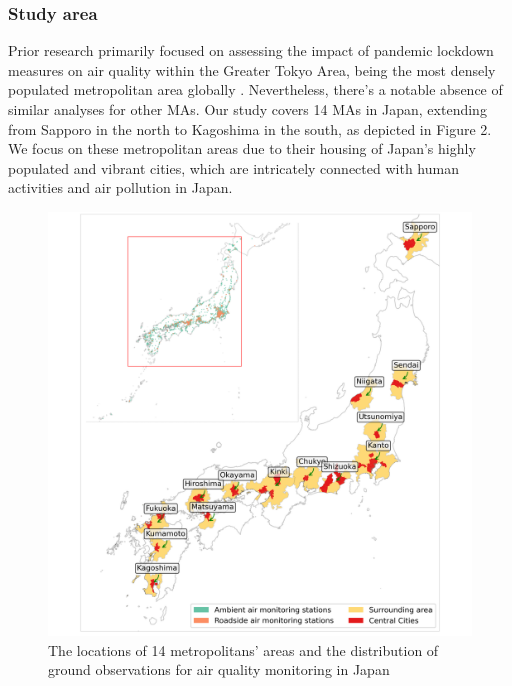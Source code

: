 \subsubsection*{Study area}
Prior research primarily focused on assessing the impact of pandemic lockdown measures on air quality within the Greater Tokyo Area, being the most densely populated metropolitan area globally \citep{damiani2022peculiar,zoran2023peculiar}. Nevertheless, there's a notable absence of similar analyses for other MAs. Our study covers 14 MAs in Japan, extending from Sapporo in the north to Kagoshima in the south, as depicted in Figure 2. We focus on these metropolitan areas due to their housing of Japan's highly populated and vibrant cities, which are intricately connected with human activities and air pollution in Japan.\par
\begin{figure}[p]
    \centering
    \includegraphics[width=\textwidth]{figs/chap4/fig2.png}
    \caption[Study area]{The locations of 14 metropolitans’ areas and the distribution of ground observations for air quality monitoring in Japan}
    \label{fig:chap4_fig2}
\end{figure}
